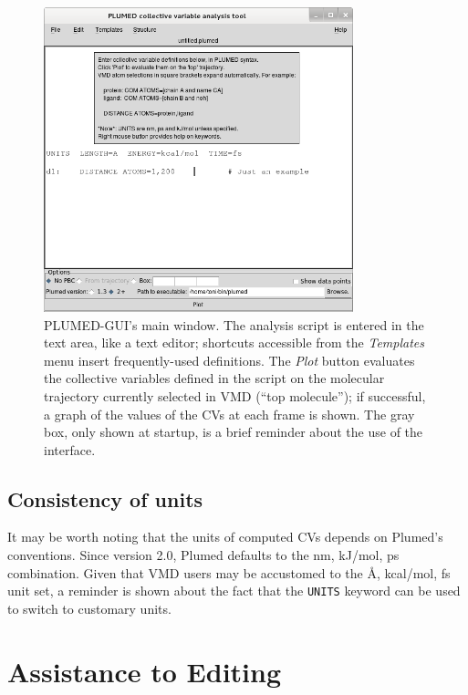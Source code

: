 \documentclass[preprint,12pt]{elsarticle}
\begin{document}
\begin{figure}
  \centering
  \includegraphics[width=0.8\textwidth]{images/main}
  \caption{PLUMED-GUI's main window.  The analysis script is entered
    in the text area, like a text editor; shortcuts accessible from
    the \emph{Templates} menu insert frequently-used definitions. The
    \emph{Plot} button evaluates the collective variables defined in
    the script on the molecular trajectory currently selected in VMD
    (``top molecule''); if successful, a graph of the values of the
    CVs at each frame is shown. The gray box, only shown at startup,
    is a brief reminder about the use of the interface.  }
  \label{fig:main}
\end{figure}




\subsection{Consistency of units}

It may be worth noting that the units of computed CVs  depends on
Plumed's conventions.  Since version 2.0, Plumed defaults to the nm,
kJ/mol, ps combination. Given that VMD users may be accustomed to the
\AA, kcal/mol, fs unit set, a reminder is shown about the fact that
the \texttt{UNITS} keyword can be used to  switch to customary
units.



\section{Assistance to Editing}
\end{document}
